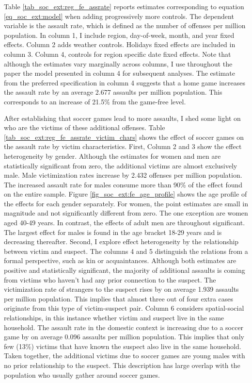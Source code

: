 \documentclass[11pt, a4paper]{article} %
\begin{document}
Table \ref{tab_soc_ext:reg_fe_assrate} reports estimates corresponding to equation \ref{eq_soc_ext:model} when adding progressively more controls. The dependent variable is the assault rate, which is defined as the number of offenses per million population. In column 1, I include region, day-of-week, month, and year fixed effects. Column 2 adds weather controls. Holidays fixed effects are included in column 3. Column 4, controls for region specific date fixed effects. Note that although the estimates vary marginally across columns, I use throughout the paper the model presented in column 4 for subsequent analyses. The estimate from the preferred specification in column 4 suggests that a home game increases the assault rate by an average 2.677 assaults per million population. This corresponds to an increase of 21.5\% from the game-free level.

After establishing that soccer games lead to more assaults, I shed some light on who are the victims of these additional offenses. Table \ref{tab_soc_ext:reg_fe_assrate_victim_chars} shows the effect of soccer games on the assault rate by victim characteristics. First, Column 2 and 3 show the effect heterogeneity by gender. Although the estimates for women and men are statistically significant from zero, the additional victims are almost exclusively male. Male victimization rates increase by 2.432 offenses per million population. The increased assault rate for males consume more than 90\% of the effect found on the entire sample. Figure \ref{fig_soc_ext:fe_age_profile} shows the age profile of the effects for each gender separately. For women, the point estimates are small in magnitude and not significantly different from zero. The one exception are women aged 40-49 years. In contrast, the effects of adult men are throughout significant. The largest effect for males is found in the age bracket 18-29 years and is decreasing thereafter. Second, I explore effect heterogeneity by the relationship between victim and suspect. The columns 4 and 5 distinguish the relations from a formal perspective, such as kin or acquaintances. Although both estimates are positive and statistically significant, the majority of additional assaults is coming from victims who haven't had any prior connection to the suspect. The victimization rate of strangers to the suspect rises by on average 1.939 assaults per million population. This implies that almost three out of four extra cases originate from this type of victim-suspect pair. Column 6 considers spatial-social relationships, in this instance whether victim and suspect live in the same household. The assault rate in the domestic context is increasing due to a soccer game by on average 0.096 assaults per million population. This implies that only few (13\%) victims that have known the suspect also live in the same household. Taken together, the additional victims due to soccer games are young males with no prior relationship to the suspect. This description has large overlap with the population who usually gather around soccer games.
\end{document}
